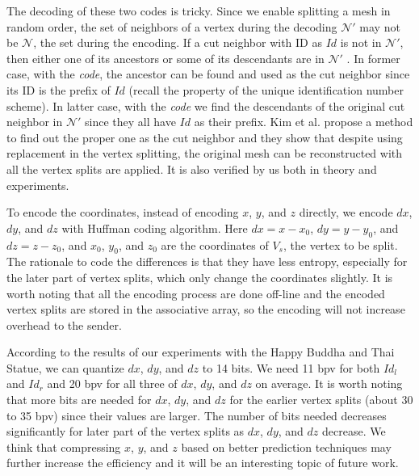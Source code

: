     The decoding of these two codes is tricky. %
    Since we enable splitting a mesh in random order, the set of neighbors of a vertex
    during the decoding $\mathcal{N}'$ may not be $\mathcal{N}$, the set during the encoding.
    If a cut neighbor with ID as $Id$ %
    is not in $\mathcal{N}'$, then either one of its 
    ancestors or some of its descendants are in $\mathcal{N}'$ \cite{multiresolution:kim}.
    In former case, with the \emph{code}, the ancestor can be found and used as 
    the cut neighbor since its ID is the prefix of $Id$ 
    (recall the property of the unique identification number scheme).
    In latter case, with the \emph{code} we find the descendants of the original 
    cut neighbor in $\mathcal{N}'$ since they all have $Id$ as their prefix.
    Kim et al. \cite{multiresolution:kim} propose a method to find out the 
    proper one as the cut neighbor and they show that despite using replacement
    in the vertex splitting, the original mesh can be 
    reconstructed with all the vertex splits are applied. It is also verified 
    by us both in theory and experiments.
    
    To encode the coordinates, instead of encoding $x$, $y$, and $z$ directly, 
    we encode $dx$, $dy$, and $dz$ with Huffman coding algorithm. 
    Here $dx = x - x_0$, $dy = y - y_0$, 
    and $dz = z - z_0$, and $x_0$, $y_0$, and $z_0$ are the coordinates of
    $V_s$, the vertex to be split. 
    The rationale to code the differences is that they have less entropy, especially
    for the later part of vertex splits, which only change the coordinates slightly.
    It is worth noting that all the encoding process are done off-line and the 
    encoded vertex splits are stored in the associative array, so the encoding will
    not increase overhead to the sender.

    According to the results of our experiments with the Happy Buddha and Thai Statue,
    we can quantize $dx$, $dy$, and $dz$ to 14 bits. 
    We need 11 bpv for both $Id_l$ and $Id_r$ 
    and 20 bpv for all three of $dx$, $dy$, and $dz$ on average.
    It is worth noting that more bits are needed for $dx$, $dy$, and $dz$ 
    for the earlier vertex splits (about 30 to 35 bpv)
    since their values are larger. 
    The number of bits needed decreases significantly for later part of the vertex splits
    as $dx$, $dy$, and $dz$ decrease. We think that compressing $x$, $y$, and $z$ 
    based on better prediction techniques may further increase the 
    efficiency and it will be an interesting topic of future work.

